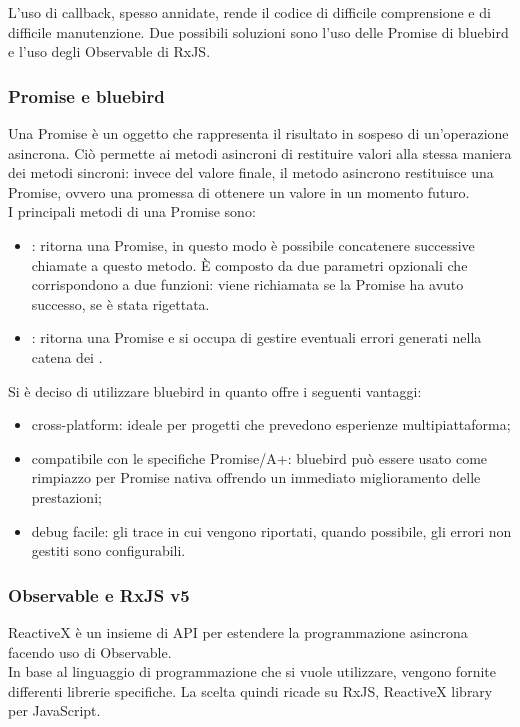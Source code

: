 L'uso di callback, spesso annidate, rende il codice di difficile comprensione e di difficile manutenzione. Due possibili soluzioni sono l'uso delle Promise di bluebird e l'uso degli Observable
di RxJS.


\subsubsection{Promise e bluebird}

Una Promise è un oggetto che rappresenta il risultato in sospeso di un’operazione asincrona. Ciò permette ai metodi asincroni di restituire valori alla stessa maniera dei metodi sincroni:
invece del valore finale, il metodo asincrono restituisce una Promise, ovvero una promessa di ottenere un valore in un momento futuro. \\
I principali metodi di una Promise sono:

\begin{itemize}

\item {}: ritorna una Promise, in questo modo è possibile concatenere successive chiamate a questo metodo. È composto da due parametri opzionali che corrispondono a
due funzioni:  viene richiamata se la Promise ha avuto successo,  se è stata rigettata.

\item {}: ritorna una Promise e si occupa di gestire eventuali errori generati nella catena dei .

\end{itemize}
Si è deciso di utilizzare bluebird in quanto offre i seguenti vantaggi:

\begin{itemize}

\item cross-platform: ideale per progetti che prevedono esperienze multipiattaforma;

\item compatibile con le specifiche Promise/A+: bluebird può essere usato come rimpiazzo per Promise nativa offrendo un immediato miglioramento delle prestazioni;

\item debug facile: gli  trace in cui vengono riportati, quando possibile, gli errori non gestiti sono configurabili.

\end{itemize}

\subsubsection{Observable e RxJS v5}
ReactiveX è un insieme di API per estendere la programmazione asincrona facendo uso di Observable.\\
In base al linguaggio di programmazione che si vuole utilizzare, vengono fornite differenti librerie specifiche.
La scelta quindi ricade su RxJS, ReactiveX library per JavaScript.


